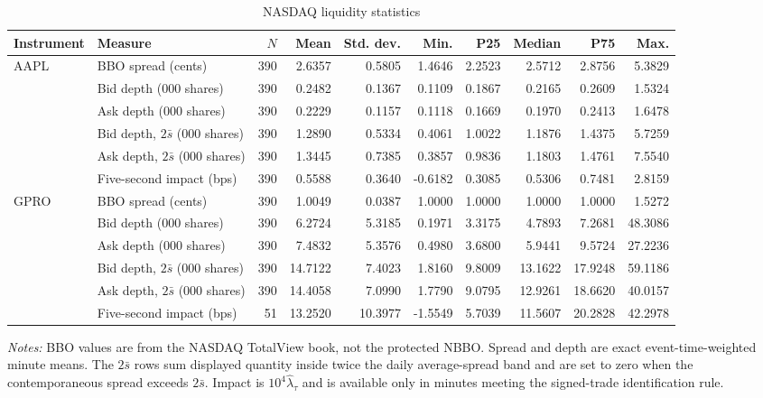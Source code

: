\documentclass[11pt]{article}
\begin{document}
\begin{landscape}
\begin{table}[H]
\centering
\caption{NASDAQ liquidity statistics}
\label{tab:stock-liquidity}
\scriptsize
\begin{threeparttable}
\begin{tabular}{@{}llrrrrrrrr@{}}
\toprule
Instrument & Measure & $N$ & Mean & Std. dev. & Min. & P25 & Median & P75 & Max.\\
\midrule
AAPL & BBO spread (cents) & 390 & 2.6357 & 0.5805 & 1.4646 & 2.2523 & 2.5712 & 2.8756 & 5.3829\\
     & Bid depth (000 shares) & 390 & 0.2482 & 0.1367 & 0.1109 & 0.1867 & 0.2165 & 0.2609 & 1.5324\\
     & Ask depth (000 shares) & 390 & 0.2229 & 0.1157 & 0.1118 & 0.1669 & 0.1970 & 0.2413 & 1.6478\\
     & Bid depth, $2\bar{s}$ (000 shares) & 390 & 1.2890 & 0.5334 & 0.4061 & 1.0022 & 1.1876 & 1.4375 & 5.7259\\
     & Ask depth, $2\bar{s}$ (000 shares) & 390 & 1.3445 & 0.7385 & 0.3857 & 0.9836 & 1.1803 & 1.4761 & 7.5540\\
     & Five-second impact (bps) & 390 & 0.5588 & 0.3640 & -0.6182 & 0.3085 & 0.5306 & 0.7481 & 2.8159\\
\addlinespace
GPRO & BBO spread (cents) & 390 & 1.0049 & 0.0387 & 1.0000 & 1.0000 & 1.0000 & 1.0000 & 1.5272\\
     & Bid depth (000 shares) & 390 & 6.2724 & 5.3185 & 0.1971 & 3.3175 & 4.7893 & 7.2681 & 48.3086\\
     & Ask depth (000 shares) & 390 & 7.4832 & 5.3576 & 0.4980 & 3.6800 & 5.9441 & 9.5724 & 27.2236\\
     & Bid depth, $2\bar{s}$ (000 shares) & 390 & 14.7122 & 7.4023 & 1.8160 & 9.8009 & 13.1622 & 17.9248 & 59.1186\\
     & Ask depth, $2\bar{s}$ (000 shares) & 390 & 14.4058 & 7.0990 & 1.7790 & 9.0795 & 12.9261 & 18.6620 & 40.0157\\
     & Five-second impact (bps) & 51 & 13.2520 & 10.3977 & -1.5549 & 5.7039 & 11.5607 & 20.2828 & 42.2978\\
\bottomrule
\end{tabular}
\begin{tablenotes}[flushleft]\footnotesize
\item \textit{Notes:} BBO values are from the NASDAQ TotalView book, not the protected NBBO. Spread and depth are exact event-time-weighted minute means. The $2\bar{s}$ rows sum displayed quantity inside twice the daily average-spread band and are set to zero when the contemporaneous spread exceeds $2\bar{s}$. Impact is $10^4\widehat{\lambda}_{\tau}$ and is available only in minutes meeting the signed-trade identification rule.
\end{tablenotes}
\end{threeparttable}
\end{table}
\end{landscape}
\end{document}
